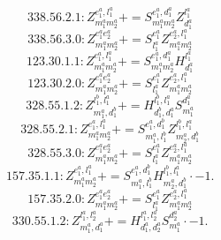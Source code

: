 \documentclass[letterpaper,10pt,fleqn,leqno,onecolumn]{article}
\begin{document}
\begin{equation} \;\;\;\;\;\;  338.56.2.1: Z^{e_{1}^{a},l_{1}^{a}}_{m_{1}^{a}m_{2}^{a}}+=S^{e_{1}^{a},d_{1}^{a}}_{m_{1}^{a}m_{2}^{a}}Z^{l_{1}^{a}}_{d_{1}^{a}} \end{equation}
\begin{equation} \;\;\;\;\;\;  338.56.3.0: Z^{e_{1}^{a}e_{2}^{a}}_{m_{1}^{a}m_{2}^{a}}+=S^{e_{1}^{a}}_{l_{1}^{a}}Z^{e_{2}^{a},l_{1}^{a}}_{m_{1}^{a}m_{2}^{a}} \end{equation}
\begin{equation} \;\;\;\;\;\;  123.30.1.1: Z^{e_{1}^{a},l_{1}^{a}}_{m_{1}^{a}m_{2}^{a}}+=S^{e_{1}^{a},d_{1}^{a}}_{m_{1}^{a}m_{2}^{a}}H^{l_{1}^{a}}_{d_{1}^{a}} \end{equation}
\begin{equation} \;\;\;\;\;\;  123.30.2.0: Z^{e_{1}^{a}e_{2}^{a}}_{m_{1}^{a}m_{2}^{a}}+=S^{e_{1}^{a}}_{l_{1}^{a}}Z^{e_{2}^{a},l_{1}^{a}}_{m_{1}^{a}m_{2}^{a}} \end{equation}
\begin{equation} \;\;\;\;\;\;  328.55.1.2: Z^{l_{1}^{b},l_{1}^{a}}_{m_{1}^{a},d_{1}^{b}}+=H^{l_{1}^{b},l_{1}^{a}}_{d_{1}^{b},d_{1}^{a}}S^{d_{1}^{a}}_{m_{1}^{a}} \end{equation}
\begin{equation} \;\;\;\;\;\;  328.55.2.1: Z^{e_{1}^{a},l_{1}^{a}}_{m_{1}^{a}m_{2}^{a}}+=S^{e_{1}^{a},d_{1}^{b}}_{m_{1}^{a},l_{1}^{b}}Z^{l_{1}^{b},l_{1}^{a}}_{m_{2}^{a},d_{1}^{b}} \end{equation}
\begin{equation} \;\;\;\;\;\;  328.55.3.0: Z^{e_{1}^{a}e_{2}^{a}}_{m_{1}^{a}m_{2}^{a}}+=S^{e_{1}^{a}}_{l_{1}^{a}}Z^{e_{2}^{a},l_{1}^{a}}_{m_{1}^{a}m_{2}^{a}} \end{equation}
\begin{equation} \;\;\;\;\;\;  157.35.1.1: Z^{e_{1}^{a},l_{1}^{a}}_{m_{1}^{a}m_{2}^{a}}+=S^{e_{1}^{a},d_{1}^{b}}_{m_{1}^{a},l_{1}^{b}}H^{l_{1}^{b},l_{1}^{a}}_{m_{2}^{a},d_{1}^{b}}\cdot -1. \end{equation}
\begin{equation} \;\;\;\;\;\;  157.35.2.0: Z^{e_{1}^{a}e_{2}^{a}}_{m_{1}^{a}m_{2}^{a}}+=S^{e_{1}^{a}}_{l_{1}^{a}}Z^{e_{2}^{a},l_{1}^{a}}_{m_{1}^{a}m_{2}^{a}} \end{equation}
\begin{equation} \;\;\;\;\;\;  330.55.1.2: Z^{l_{1}^{a},l_{2}^{a}}_{m_{1}^{a},d_{1}^{a}}+=H^{l_{1}^{a},l_{2}^{a}}_{d_{1}^{a},d_{2}^{a}}S^{d_{2}^{a}}_{m_{1}^{a}}\cdot -1. \end{equation}
\end{document}
